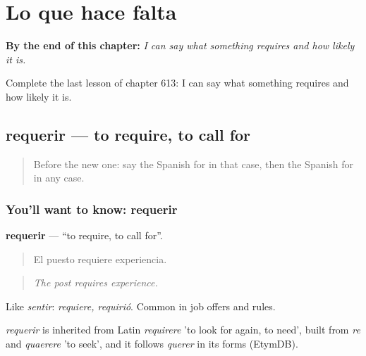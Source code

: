 
\chapter{Lo que hace falta}
\label{ch:es-lo-que-hace-falta}

\begin{chapteropening}
\textbf{By the end of this chapter:} \emph{I can say what something requires and how likely it is.}

Complete the last lesson of chapter 613: I can say what something requires and how likely it is.
\end{chapteropening}

\section[requerir]{requerir — to require, to call for}

\label{lesson:ES-C613-requerir}



\begin{quote}
Before the new one: say the Spanish for in that case, then the Spanish for in any case.
\end{quote}

\subsection*{You'll want to know: requerir}
\textbf{requerir} — \textquotedblleft{}to require, to call for\textquotedblright{}.

\begin{quote}
El puesto requiere experiencia.
\end{quote}

\begin{quote}
\emph{The post requires experience.}
\end{quote}

Like \emph{sentir}: \emph{requiere, requirió}. Common in job offers and rules.

\begin{cousinweb}
\emph{requerir} is inherited from Latin \emph{requirere} 'to look for again, to need', built from \emph{re} and \emph{quaerere} 'to seek', and it follows \emph{querer} in its forms (EtymDB).
\end{cousinweb}

